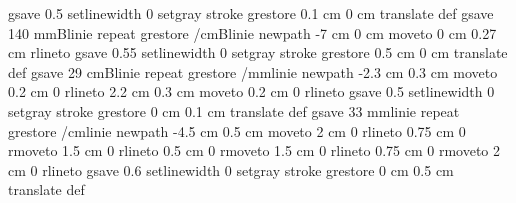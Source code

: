 {{{                     gsave
                     0.5 setlinewidth
                     0 setgray
                     stroke
                     grestore
                      0.1 cm 0 cm translate
                    } def
gsave
140 {mmBlinie} repeat
grestore
   /cmBlinie { newpath
                   -7 cm 0 cm moveto
                    0 cm 0.27 cm rlineto
                     gsave
                     0.55 setlinewidth
                     0 setgray
                     stroke
                     grestore
                      0.5 cm 0 cm translate
                    } def
gsave
   29 {cmBlinie} repeat
grestore
/mmlinie { newpath
                   -2.3 cm 0.3 cm moveto
                    0.2 cm 0 rlineto
                    2.2 cm 0.3 cm moveto
                    0.2 cm 0 rlineto
                     gsave
                     0.5 setlinewidth
                     0 setgray
                     stroke
                     grestore
                      0 cm 0.1 cm translate
                    } def
gsave
33 {mmlinie} repeat
grestore
/cmlinie { newpath
                   -4.5 cm 0.5 cm moveto
                    2 cm 0 rlineto
                    0.75 cm 0 rmoveto
                    1.5 cm 0 rlineto
                    0.5 cm 0 rmoveto
                    1.5 cm 0 rlineto
                    0.75 cm 0 rmoveto
                    2 cm 0 rlineto
                     gsave
                     0.6 setlinewidth
                     0 setgray
                     stroke
                     grestore
                      0 cm 0.5 cm translate
                   } def
}}
